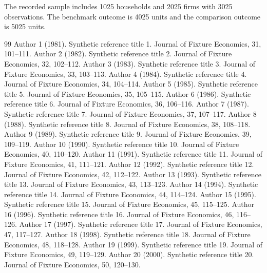\documentclass[10pt]{article}
\begin{document}
The recorded sample includes 1025 households and 2025 firms with 3025 observations. The benchmark outcome is 4025 units and the comparison outcome is 5025 units.
\begin{thebibliography}{99}
 Author 1 (1981). Synthetic reference title 1. Journal of Fixture Economics, 31, 101--111.
 Author 2 (1982). Synthetic reference title 2. Journal of Fixture Economics, 32, 102--112.
 Author 3 (1983). Synthetic reference title 3. Journal of Fixture Economics, 33, 103--113.
 Author 4 (1984). Synthetic reference title 4. Journal of Fixture Economics, 34, 104--114.
 Author 5 (1985). Synthetic reference title 5. Journal of Fixture Economics, 35, 105--115.
 Author 6 (1986). Synthetic reference title 6. Journal of Fixture Economics, 36, 106--116.
 Author 7 (1987). Synthetic reference title 7. Journal of Fixture Economics, 37, 107--117.
 Author 8 (1988). Synthetic reference title 8. Journal of Fixture Economics, 38, 108--118.
 Author 9 (1989). Synthetic reference title 9. Journal of Fixture Economics, 39, 109--119.
 Author 10 (1990). Synthetic reference title 10. Journal of Fixture Economics, 40, 110--120.
 Author 11 (1991). Synthetic reference title 11. Journal of Fixture Economics, 41, 111--121.
 Author 12 (1992). Synthetic reference title 12. Journal of Fixture Economics, 42, 112--122.
 Author 13 (1993). Synthetic reference title 13. Journal of Fixture Economics, 43, 113--123.
 Author 14 (1994). Synthetic reference title 14. Journal of Fixture Economics, 44, 114--124.
 Author 15 (1995). Synthetic reference title 15. Journal of Fixture Economics, 45, 115--125.
 Author 16 (1996). Synthetic reference title 16. Journal of Fixture Economics, 46, 116--126.
 Author 17 (1997). Synthetic reference title 17. Journal of Fixture Economics, 47, 117--127.
 Author 18 (1998). Synthetic reference title 18. Journal of Fixture Economics, 48, 118--128.
 Author 19 (1999). Synthetic reference title 19. Journal of Fixture Economics, 49, 119--129.
 Author 20 (2000). Synthetic reference title 20. Journal of Fixture Economics, 50, 120--130.
\end{thebibliography}
\end{document}

